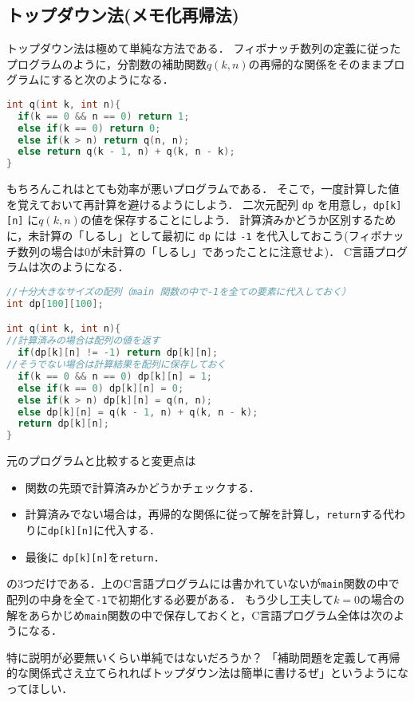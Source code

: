 \documentclass[a4paper,twoside,onecolumn,openany,article]{memoir}
\theoremstyle{remark}
\begin{document}
\subsection{トップダウン法(メモ化再帰法)}
トップダウン法は極めて単純な方法である．
フィボナッチ数列の定義に従ったプログラムのように，分割数の補助関数$q(k,n)$の再帰的な関係をそのままプログラムにすると次のようになる．

\begin{lstlisting}[basicstyle=\ttfamily\small,showstringspaces=false,language=C,frame=single]
int q(int k, int n){
  if(k == 0 && n == 0) return 1;
  else if(k == 0) return 0;
  else if(k > n) return q(n, n);
  else return q(k - 1, n) + q(k, n - k);
}
\end{lstlisting}
もちろんこれはとても効率が悪いプログラムである．
そこで，一度計算した値を覚えておいて再計算を避けるようにしよう．
二次元配列 \texttt{dp} を用意し，\texttt{dp[k][n]} に$q(k, n)$の値を保存することにしよう．
計算済みかどうか区別するために，未計算の「しるし」として最初に \texttt{dp} には \texttt{-1} を代入しておこう(フィボナッチ数列の場合は0が未計算の「しるし」であったことに注意せよ)．
C言語プログラムは次のようになる．
\begin{lstlisting}[basicstyle=\ttfamily\small,showstringspaces=false,language=C,frame=single]
//十分大きなサイズの配列（main 関数の中で-1を全ての要素に代入しておく）
int dp[100][100];

int q(int k, int n){
//計算済みの場合は配列の値を返す
  if(dp[k][n] != -1) return dp[k][n];
//そうでない場合は計算結果を配列に保存しておく
  if(k == 0 && n == 0) dp[k][n] = 1;
  else if(k == 0) dp[k][n] = 0;
  else if(k > n) dp[k][n] = q(n, n);
  else dp[k][n] = q(k - 1, n) + q(k, n - k);
  return dp[k][n];
}
\end{lstlisting}
元のプログラムと比較すると変更点は
\begin{itemize}
\item 関数の先頭で計算済みかどうかチェックする．
\item 計算済みでない場合は，再帰的な関係に従って解を計算し，\texttt{return}する代わりに\texttt{dp[k][n]}に代入する．
\item 最後に \texttt{dp[k][n]}を\texttt{return}．
\end{itemize}
の3つだけである．上のC言語プログラムには書かれていないが\texttt{main}関数の中で配列の中身を全て\texttt{-1}で初期化する必要がある．
もう少し工夫して$k=0$の場合の解をあらかじめ\texttt{main}関数の中で保存しておくと，C言語プログラム全体は次のようになる．


特に説明が必要無いくらい単純ではないだろうか？
「補助問題を定義して再帰的な関係式さえ立てられればトップダウン法は簡単に書けるぜ」というようになってほしい．
\end{document}
